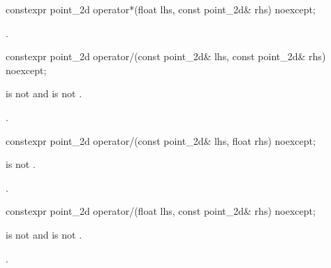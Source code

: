 %
\begin{itemdecl}
constexpr point_2d operator*(float lhs, const point_2d& rhs) noexcept;
\end{itemdecl}
\begin{itemdescr}
\pnum
\returns
{}.
\end{itemdescr}

%
\begin{itemdecl}
constexpr point_2d operator/(const point_2d& lhs, const point_2d& rhs) 
  noexcept;
\end{itemdecl}
\begin{itemdescr}
\pnum
\requires
{} is not  and  is not .

\pnum
\returns
{}.
\end{itemdescr}

%
\begin{itemdecl}
constexpr point_2d operator/(const point_2d& lhs, float rhs) noexcept;
\end{itemdecl}
\begin{itemdescr}
\pnum
\requires
{} is not .

\pnum
\returns
{}.
\end{itemdescr}

%
\begin{itemdecl}
constexpr point_2d operator/(float lhs, const point_2d& rhs) noexcept;
\end{itemdecl}
\begin{itemdescr}
\pnum
\requires
{} is not  and  is not .

\pnum
\returns
{}.
\end{itemdescr}

